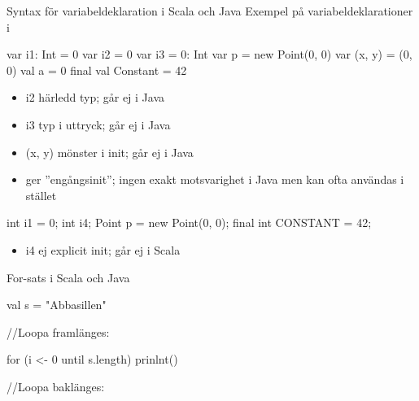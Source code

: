 \begin{Slide}{Syntax för variabeldeklaration i Scala och Java}\SlideFontSmall
Exempel på variabeldeklarationer i
\begin{multicols}{2}
\begin{CodeSmall}[basicstyle=\ttfamily\SlideFontSize{8}{10}]
  var i1: Int = 0
  var i2 = 0
  var i3 = 0: Int
  var p = new Point(0, 0)
  var (x, y) = (0, 0)        
  val a = 0
  final val Constant = 42
\end{CodeSmall}
\begin{itemize}\SlideFontTiny
\item i2 härledd typ; går ej i Java

\item i3 typ i uttryck; går ej i Java

\item (x, y) mönster i init; går ej i Java

\item {} ger ''engångsinit''; ingen exakt motsvarighet i Java men  kan ofta användas i stället
\end{itemize}

\columnbreak

\begin{CodeSmall}[language=Java,basicstyle=\ttfamily\SlideFontSize{8}{10}]
  int i1 = 0;
  int i4;
  Point p = new Point(0, 0);
  final int CONSTANT = 42;
\end{CodeSmall}
\begin{itemize}\SlideFontTiny
\item i4 ej explicit init; går ej i Scala
\end{itemize}
\end{multicols}

\end{Slide}



\begin{Slide}{For-sats i Scala och Java}
\begin{multicols}{2}
\begin{CodeSmall}[basicstyle=\ttfamily\SlideFontSize{8}{10}]
  val s = "Abbasillen"

  //Loopa framlänges:
  
  for (i <- 0 until s.length) prinlnt()
  
  //Loopa baklänges:
\end{CodeSmall}

\columnbreak

\begin{CodeSmall}[language=Java,basicstyle=\ttfamily\SlideFontSize{8}{10}]

\end{CodeSmall}
\end{multicols}
\end{Slide}


